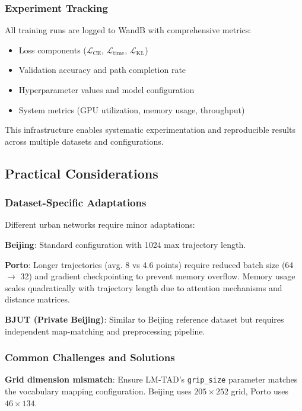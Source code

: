 \subsubsection{Experiment Tracking}

All training runs are logged to WandB with comprehensive metrics:

\begin{itemize}[noitemsep,topsep=0pt]
\item Loss components ($\mathcal{L}_{\text{CE}}$, $\mathcal{L}_{\text{time}}$, $\mathcal{L}_{\text{KL}}$)
\item Validation accuracy and path completion rate
\item Hyperparameter values and model configuration
\item System metrics (GPU utilization, memory usage, throughput)
\end{itemize}

This infrastructure enables systematic experimentation and reproducible results across multiple datasets and configurations.

\subsection{Practical Considerations}
\label{sec:impl-practical}

\subsubsection{Dataset-Specific Adaptations}

Different urban networks require minor adaptations:

\textbf{Beijing}: Standard configuration with 1024 max trajectory length.

\textbf{Porto}: Longer trajectories (avg. 8 vs 4.6 points) require reduced batch size (64 $\rightarrow$ 32) and gradient checkpointing to prevent memory overflow. Memory usage scales quadratically with trajectory length due to attention mechanisms and distance matrices.

\textbf{BJUT (Private Beijing)}: Similar to Beijing reference dataset but requires independent map-matching and preprocessing pipeline.

\subsubsection{Common Challenges and Solutions}

\textbf{Grid dimension mismatch}: Ensure LM-TAD's \texttt{grip\_size} parameter matches the vocabulary mapping configuration. Beijing uses $205 \times 252$ grid, Porto uses $46 \times 134$.

